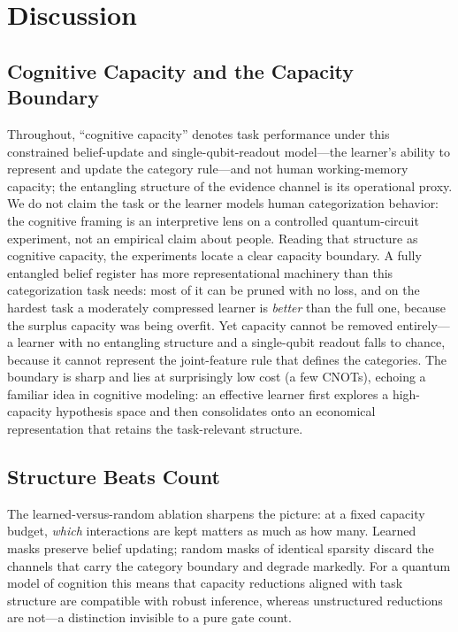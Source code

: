 \documentclass[conference]{IEEEtran}
\begin{document}
\section{Discussion}

\subsection{Cognitive Capacity and the Capacity Boundary}

Throughout, ``cognitive capacity'' denotes task performance under this constrained
belief-update and single-qubit-readout model---the learner's ability to represent and
update the category rule---and not human working-memory capacity; the entangling structure
of the evidence channel is its operational proxy. We do not claim the task or the learner
models human categorization behavior: the cognitive framing is an interpretive lens on a
controlled quantum-circuit experiment, not an empirical claim about people. Reading that
structure as cognitive capacity, the experiments locate a clear capacity boundary. A fully entangled belief register has more representational
machinery than this categorization task needs: most of it can be pruned with no loss, and
on the hardest task a moderately compressed learner is \emph{better} than the full one,
because the surplus capacity was being overfit. Yet capacity cannot be removed entirely---a
learner with no entangling structure and a single-qubit readout falls to chance, because it
cannot represent the joint-feature rule that defines the categories. The boundary is sharp
and lies at surprisingly low cost (a few CNOTs), echoing a familiar idea in cognitive
modeling: an effective learner first explores a high-capacity hypothesis space and then
consolidates onto an economical representation that retains the task-relevant structure.

\subsection{Structure Beats Count}

The learned-versus-random ablation sharpens the picture: at a fixed capacity budget,
\emph{which} interactions are kept matters as much as how many. Learned masks preserve
belief updating; random masks of identical sparsity discard the channels that carry the
category boundary and degrade markedly. For a quantum model of cognition this means that
capacity reductions aligned with task structure are compatible with robust inference,
whereas unstructured reductions are not---a distinction invisible to a pure gate count.
\end{document}
